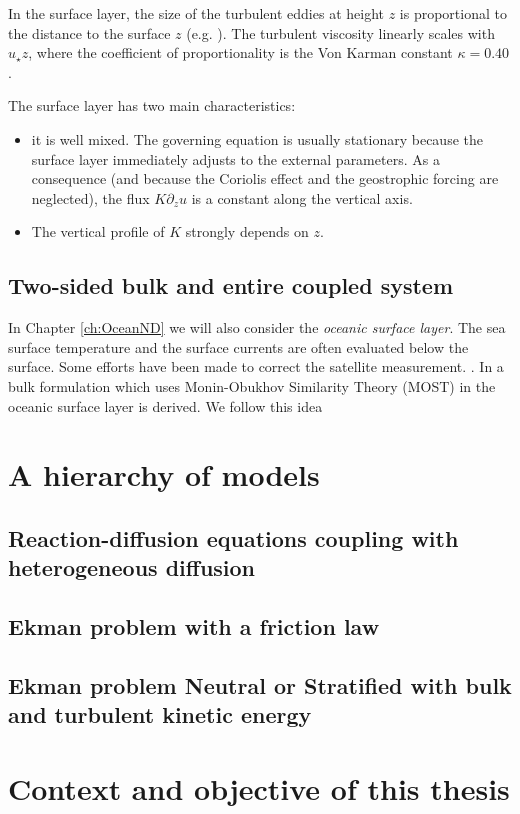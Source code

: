 In the surface layer, the size of the turbulent eddies at height $z$
is proportional to the distance to the surface $z$
(e.g. \cite{kawai_wall-modeling_2012}).
The turbulent viscosity
linearly scales with $u_\star z$, where the coefficient of
proportionality is the Von Karman constant $\kappa = 0.40$.
\par
The surface layer has two main characteristics:
\begin{itemize}
	\item it is well mixed. The governing equation
		is usually stationary because the surface layer
		immediately adjusts to the external parameters.
		As a consequence (and because the Coriolis effect
		and the geostrophic forcing are neglected),
		the flux $K \partial_z u$
		is a constant along the vertical axis.
	\item The vertical profile of $K$ strongly depends 
		on $z$.
\end{itemize}
\subsection{Two-sided bulk and entire coupled system}
\label{sec:airseaSCM_twoSided}
In Chapter \ref{ch:OceanND} we will also consider the
\textit{oceanic surface layer}.
The sea surface temperature and the surface currents are often
evaluated below the surface.
Some efforts have been made to correct the satellite measurement.
.
In \citep{pelletier_two-sided_2021} a bulk formulation which
uses Monin-Obukhov Similarity Theory (MOST) in the oceanic
surface layer is derived.
We follow this idea 

\section{A hierarchy of models}
\label{sec:airseaSCM_hierarchy}
\subsection{Reaction-diffusion equations coupling
with heterogeneous diffusion}
\subsection{Ekman problem with a friction law}
\label{sec:airseaSCM_hierarchy_Ekman}
\subsection{Ekman problem Neutral or Stratified with bulk and turbulent kinetic energy}
\section{Context and objective of this thesis}
\label{sec:airseaSCM_context_objectives}

